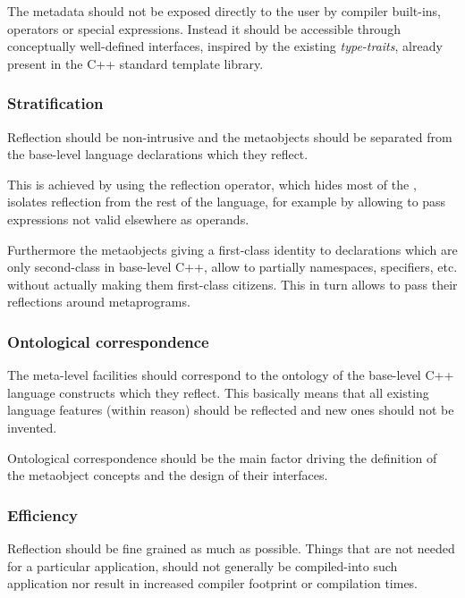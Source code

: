 The metadata should not be exposed directly
to the user by compiler built-ins, operators or special expressions.
Instead it should be accessible through conceptually well-defined interfaces,
inspired by the existing {\em type-traits}, already present in
the C++ standard template library.

\subsubsection{Stratification}
\label{design-stratification}

Reflection should be non-intrusive and the metaobjects should be separated
from the base-level language declarations which they reflect.

This is achieved by using the reflection operator, which hides most of the
, isolates reflection from the rest of the language,
for example by allowing to pass expressions not valid elsewhere as operands.

Furthermore the metaobjects giving a first-class identity to declarations
which are only second-class in base-level C++,
allow to partially  namespaces, specifiers, etc. without actually
making them first-class citizens. This in turn allows to pass their reflections around
metaprograms.

\subsubsection{Ontological correspondence}
\label{design-onto-corr}

The meta-level facilities should
correspond to the ontology of the base-level C++ language constructs
which they reflect. This basically means that all existing language
features (within reason) should be reflected and new ones should not be invented.

Ontological correspondence should be the main factor driving the definition of the
metaobject concepts and the design of their interfaces.


\subsubsection{Efficiency}
\label{design-efficiency}

Reflection should be fine grained as much as possible.
Things that are not needed for a particular application,
should not generally be compiled-into such application nor result in
increased compiler footprint or compilation times.

